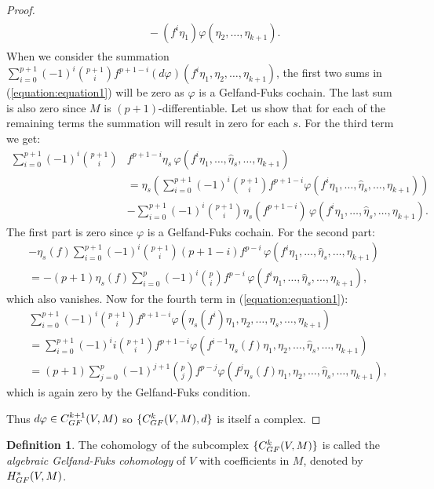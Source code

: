 \documentclass[12pt]{amsart}
\newcommand{\GF}{{\textup{GF}}}
\newcommand{\vphi}{{\varphi}}
\theoremstyle{definition}
\newtheorem{definition}{Definition}[section]
\begin{document}
\begin{proof}
\begin{align}
\begin{split}
&\quad - (f^i\eta_1) \vphi(\eta_2, \dots,  \eta_{k+1}). 
\end{split}
\end{align}
When we consider the summation $\sum_{i=0}^{p+1} (-1)^i \binom{p+1}{i} f^{p+1-i} (d\vphi)(f^i \eta_1, \eta_2, \dots, \eta_{k+1})$, the first two sums in (\ref{equation:equation1}) will be zero as $\vphi$ is a Gelfand-Fuks cochain. The last sum is also zero since $M$ is $(p+1)$-differentiable.
Let us show that for each of the remaining terms the summation will result in zero for each $s$. For the third term we get:
\begin{align*}
\sum_{i=0}^{p+1} (-1)^i \binom{p+1}{i}& f^{p+1-i} 
\eta_s \,\vphi(f^i\eta_1, \dots, \hat{\eta}_s, \dots, \eta_{k+1}) \\
&= \eta_s \left( \sum_{i=0}^{p+1} (-1)^i \binom{p+1}{i} f^{p+1-i} 
\vphi(f^i\eta_1, \dots, \hat{\eta}_s, \dots, \eta_{k+1}) \right) \\
&- \sum_{i=0}^{p+1} (-1)^i \binom{p+1}{i} \eta_s(f^{p+1-i}) 
 \,\vphi(f^i\eta_1, \dots, \hat{\eta}_s, \dots, \eta_{k+1}).
\end{align*}
The first part is zero since $\vphi$ is a Gelfand-Fuks cochain. For the second part:
\begin{align*}
- \eta_s(f) \sum_{i=0}^{p+1} (-1)^i \binom{p+1}{i} (p+1-i) f^{p-i} 
 \,\vphi(f^i\eta_1, \dots, \hat{\eta}_s, \dots, \eta_{k+1}) \\
= - (p+1) \eta_s(f) \sum_{i=0}^{p} (-1)^i \binom{p}{i} f^{p-i} 
 \,\vphi(f^i\eta_1, \dots, \hat{\eta}_s, \dots, \eta_{k+1}),
\end{align*}
which also vanishes. Now for the fourth term in (\ref{equation:equation1}):
\begin{align*}
&\sum_{i=0}^{p+1} (-1)^i \binom{p+1}{i} f^{p+1-i} 
\vphi(\eta_s(f^i) \eta_1, \eta_2, \dots, \hat{\eta}_s, \dots, \eta_{k+1}) \\
&= \sum_{i=0}^{p+1} (-1)^i i \binom{p+1}{i} f^{p+1-i} 
\vphi(f^{i-1} \eta_s(f) \eta_1, \eta_2, \dots, \hat{\eta}_s, \dots, \eta_{k+1}) \\
&= (p+1) \sum_{j=0}^{p} (-1)^{j+1} \binom{p}{j} f^{p-j} 
\vphi(f^{j} \eta_s(f) \eta_1, \eta_2, \dots, \hat{\eta}_s, \dots, \eta_{k+1}),
\end{align*}
which is again zero by the Gelfand-Fuks condition.

Thus $d\vphi \in C^{k+1}_{\GF}(V, M)$ so $\{C_{\GF}^k(V, M), d\}$ is itself a complex. 
\end{proof}

\begin{definition}\label{definition:GelfandFukscohomology}
The cohomology of the subcomplex $\{C^k_{\GF}(V, M)\}$ is called the \emph{algebraic Gelfand-Fuks cohomology} of $V$ with coefficients in $M$, denoted by $H_{\GF}^*(V, M)$.  
\end{definition}
\end{document}

